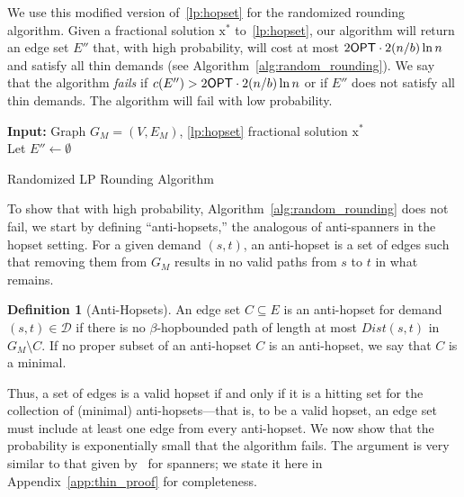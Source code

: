 \documentclass{article}
\theoremstyle{definition}
\newtheorem{definition}{Definition}
\theoremstyle{remark}
\def\opt {{\sf OPT}}
\begin{document}
We use this modified version of~\ref{lp:hopset} for the randomized rounding algorithm. Given a fractional solution $\bm{\mathrm{x}}^*$ to~\ref{lp:hopset}, our algorithm will return an edge set $E''$ that, with high probability, will cost at most $2{\opt} \cdot 2(n/b)  \ln{n}$ and satisfy all thin demands (see Algorithm~\ref{alg:random_rounding}). We say that the algorithm \textit{fails} if $c(E'') > 2{\opt} \cdot 2(n/b)  \ln{n}$ or if $E''$ does not satisfy all thin demands. The algorithm will fail with low probability.

\begin{algorithm}[h]
\DontPrintSemicolon

\textbf{Input:} Graph $G_M = (V, E_M)$, \ref{lp:hopset} fractional solution $\bm{\mathrm{x}}^*$ \\

Let $E'' \gets \emptyset$ \; \;

 \;

    

\caption{\label{alg:random_rounding} Randomized LP Rounding Algorithm }
\end{algorithm}

To show that with high probability, Algorithm~\ref{alg:random_rounding} does not fail, we start by defining ``anti-hopsets,'' the analogous of anti-spanners in the hopset setting. For a given demand $(s,t)$, an anti-hopset is a set of edges such that removing them from $G_M$ results in no valid paths from $s$ to $t$ in what remains.

\begin{definition}[Anti-Hopsets]
    An edge set $C \subseteq E$ is an anti-hopset for demand $(s,t) \in \mathcal{D}$ if there is no $\beta$-hopbounded path of length at most $Dist(s,t)$ in $G_M \setminus C$. If no proper subset of an anti-hopset $C$ is an anti-hopset, we say that $C$ is a minimal.
\end{definition}

Thus, a set of edges is a valid hopset if and only if it is a hitting set for the collection of (minimal) anti-hopsets---that is, to be a valid hopset, an edge set must include at least one edge from every anti-hopset.
We now show that the probability is exponentially small that the algorithm fails. The argument is very similar to that given by~\cite{BBMRY11} for spanners; we state it \iflong here \else in Appendix~\ref{app:thin_proof} \fi for completeness.
\end{document}
